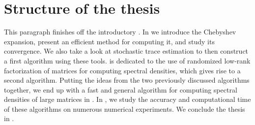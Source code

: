 
\section{Structure of the thesis}
\label{sec:1-introduction-structure}

This paragraph finishes off the introductory .
In  we introduce the Chebyshev expansion, present an
efficient method for computing it, and study its convergence. We also take a
look at stochastic trace estimation to then construct a first algorithm using these tools.
 is dedicated to the use of randomized low-rank factorization
of matrices for computing spectral densities, which gives rise to a second algorithm.
Putting the ideas from the two previously discussed algorithms together,
we end up with a fast and general algorithm for computing spectral densities
of large matrices in . In ,
we study the accuracy and computational time of these algorithms on numerous
numerical experiments. We conclude the thesis in .
